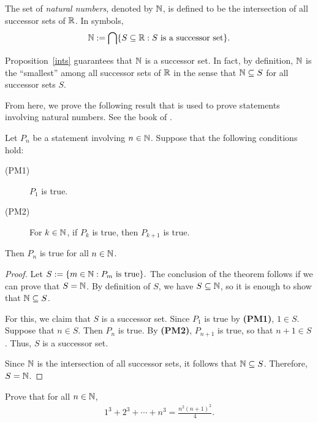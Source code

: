 \begin{defn}\label{nat}
	\cite{BkEx} The set of \textit{natural numbers}, denoted by $\mathbb{N}$, is defined to be the intersection of all successor sets of $\mathbb{R}$. In symbols,
	\[
	\mathbb{N}:=\bigcap\{S\subseteq\mathbb{R}: S\text{ is a successor set}\}.
	\]
\end{defn}

Proposition~\ref{ints} guarantees that $\mathbb{N}$ is a successor set. In fact, by definition, $\mathbb{N}$ is the ``smallest'' among all successor sets of $\mathbb{R}$ in the sense that $\mathbb{N}\subseteq S$ for all successor sets $S$.

From here, we prove the following result that is used to prove statements involving natural numbers. See the book of \cite{BkEx}.

\begin{thm}\label{pmi}
	Let $P_n$ be a statement involving $n\in\mathbb{N}$. Suppose that the following conditions hold:
	\begin{description}
		\item[(PM1)] $P_1$ is true.
		\item[(PM2)] For $k\in\mathbb{N}$, if $P_k$ is true, then $P_{k+1}$ is true.
	\end{description}
	Then $P_n$ is true for all $n\in\mathbb{N}$.
\end{thm}

\begin{proof}
	Let $S:=\{m\in\mathbb{N}: P_m\text{ is true}\}.$ The conclusion of the theorem follows if we can prove that $S=\mathbb{N}$. By definition of $S$, we have $S\subseteq\mathbb{N}$, so it is enough to show that $\mathbb{N}\subseteq S$.
	
	For this, we claim that $S$ is a successor set. Since $P_1$ is true by \textbf{(PM1)}, $1\in S$. Suppose that $n\in S$. Then $P_n$ is true. By \textbf{(PM2)}, $P_{n+1}$ is true, so that $n+1\in S$. Thus, $S$ is a successor set.
	
	Since $\mathbb{N}$ is the intersection of all successor sets, it follows that $\mathbb{N}\subseteq S$. Therefore, $S=\mathbb{N}$.
\end{proof}

\begin{ex}
	Prove that for all $n\in\mathbb{N}$,
	\begin{align}\label{pmiex}
		1^3 + 2^3 + \cdots + n^3 = \frac{n^2(n+1)^2}{4}.
	\end{align}
\end{ex}

